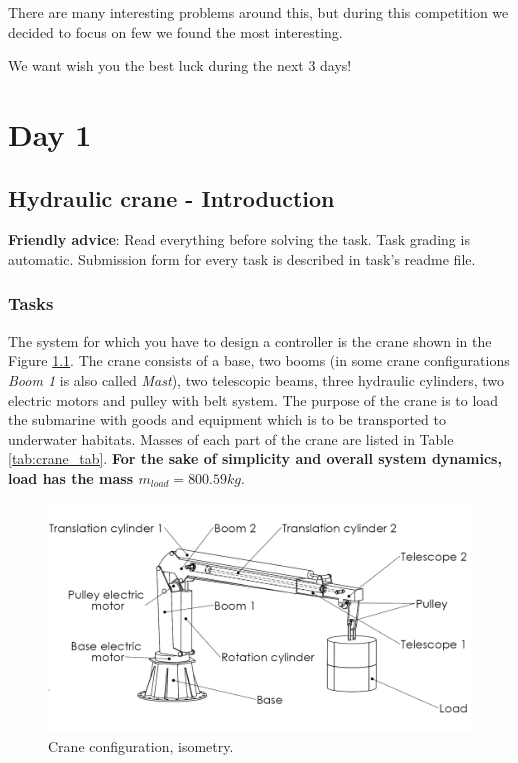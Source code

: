 \documentclass[openany]{book}
\begin{document}
	There are many interesting problems around this, but during this 
	competition we decided to focus on few we found the most interesting.
	
	We want wish you the best luck during the next 3 days!
	
	
	\chapter{Day 1}
	\section{Hydraulic crane - Introduction}
	
	
	
	\noindent 
	\textbf{Friendly advice}: Read everything before solving the task. Task 
	grading is automatic. Submission form for every task is described in task's 
	readme file.
	
	\subsection{Tasks} \label{sec:tasks}
	
	The system for which you have to design a controller is the crane shown in 
	the Figure \ref{fig:isometry}. The crane consists of a base, two booms (in 
	some crane configurations \textit{Boom 1} is also called \textit{Mast}), 
	two telescopic beams, three hydraulic cylinders, two electric motors and 
	pulley with belt system. The purpose of the crane is to load the submarine 
	with goods and equipment which is to be transported to underwater habitats. 
	Masses of each part of the crane are listed in Table 
	\ref{tab:crane_tab}.\textbf{ For the sake of simplicity and overall system 
		dynamics, load has the mass $m_{load} = 800.59 kg$}.
	
	\begin{figure}[h!]
		\centering
		\includegraphics[width=\textwidth]{kran_teret_izometrija.jpg}
		\caption{Crane configuration, isometry.}
		\label{fig:isometry}
	\end{figure}
	
\end{document}
